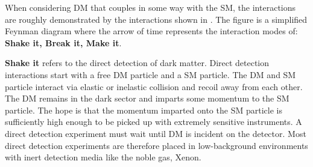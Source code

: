 \begin{figure}[h]
\end{figure}

When considering DM that couples in some way with the SM, the interactions are roughly demonstrated by the interactions shown in .
The figure is a simplified Feynman diagram where the arrow of time represents the interaction modes of: \textbf{Shake it, Break it, Make it}.

\textbf{Shake it} refers to the direct detection of dark matter.
Direct detection interactions start with a free DM particle and a SM particle.
The DM and SM particle interact via elastic or inelastic collision and recoil away from each other.
The DM remains in the dark sector and imparts some momentum to the SM particle.
The hope is that the momentum imparted onto the SM particle is sufficiently high enough to be picked up with extremely sensitive instruments.
A direct detection experiment must wait until DM is incident on the detector.
Most direct detection experiments are therefore placed in low-background environments with inert detection media like the noble gas, Xenon. \cite{Cooley:dd_dm}

